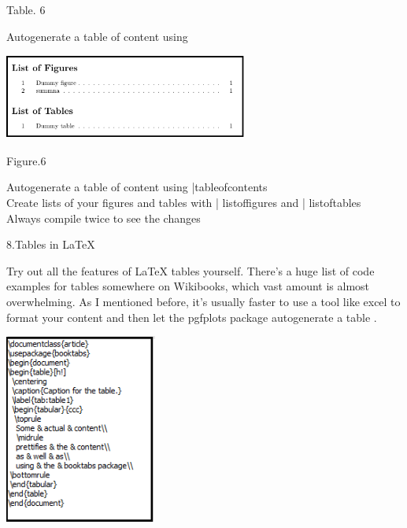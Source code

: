 \documentclass[onecolumn,journal] {IEEEtran}
\begin{document}
\begin{center}
Table. 6
\end{center}
\begin{flushleft}
Autogenerate a table of content using 
\end{flushleft}
\center
\includegraphics[width=8cm]{dislishof.png}
\begin{center}
Figure.6
\end{center} 
\begin{flushleft}
Autogenerate a table of content using  |tableofcontents\\
Create lists of your figures and tables with  | listoffigures and | listoftables\\
Always compile twice to see the changes
\newline
\newline
\begin{Large}
8.Tables in LaTeX 
\end{Large}
\newline
\newline
Try out all the features of LaTeX tables yourself. There's a huge list of code examples for tables somewhere on Wikibooks, which vast amount is almost overwhelming. As I mentioned before, it's usually faster to use a tool like excel to format your content and then let the pgfplots package autogenerate a table .


\end{flushleft}
\newpage
\center
\includegraphics[width=5cm]{codetable1.png}
\begin{center}
\end{center} 
\end{document}
